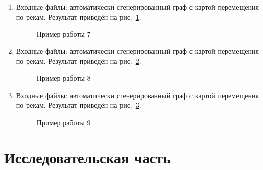 \documentclass[12pt, a4paper]{article}
\begin{document}
\begin{enumerate}
	\item Входные файлы: автоматически сгенерированный граф с картой 
	перемещения по рекам.
	Результат приведён на рис.~\ref{img:grap7}.
	\begin{figure}[h]
  		\caption{Пример работы 7}
  		\label{img:grap7}
	\end{figure}
	\item Входные файлы: автоматически сгенерированный граф с картой 
	перемещения по рекам.
	Результат приведён на рис.~\ref{img:grap8}.
	\begin{figure}[h]
  		\caption{Пример работы 8}
  		\label{img:grap8}
	\end{figure}
	\item Входные файлы: автоматически сгенерированный граф с картой 
	перемещения по рекам.
	Результат приведён на рис.~\ref{img:grap9}.
	\begin{figure}[h]
  		\caption{Пример работы 9}
  		\label{img:grap9}
	\end{figure}
\end{enumerate}
\newpage
\section{Исследовательская часть}
\end{document}
